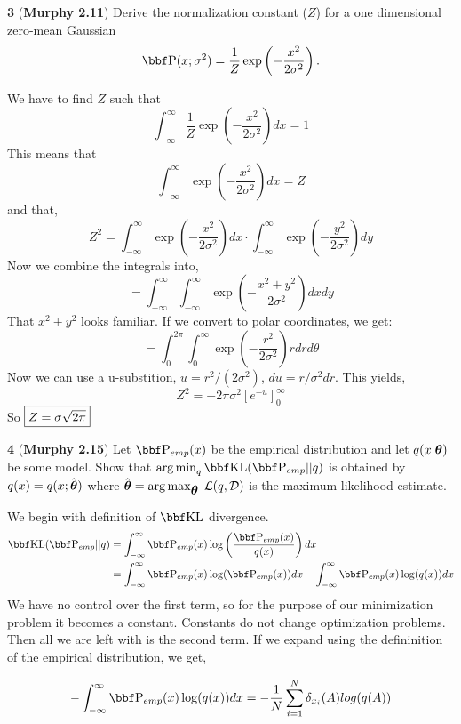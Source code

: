 \documentclass[12pt,letterpaper,fleqn]{hmcpset}
\begin{document}
\newpage

\textbf{3} (\textbf{Murphy 2.11}) Derive the normalization constant ($Z$) for a one dimensional
zero-mean Gaussian
\[
    \PP(x; \sigma^2) = \frac{1}{Z}\exp\left(-\frac{x^2}{2\sigma^2}\right).
\]

\begin{solution}
	We have to find $Z$ such that
	$$\int_{-\infty}^{\infty}\frac{1}{Z}\exp\left(-\frac{x^2}{2\sigma^2}\right)dx = 1$$
	This means that
	$$\int_{-\infty}^{\infty}\exp\left(-\frac{x^2}{2\sigma^2}\right)dx = Z$$
	and that, 
	$$ Z^2 = \int_{-\infty}^{\infty}\exp\left(-\frac{x^2}{2\sigma^2}\right)dx \cdot \int_{-\infty}^{\infty}\exp\left(-\frac{y^2}{2\sigma^2}\right)dy $$
	Now we combine the integrals into,
	$$ = \int_{-\infty}^{\infty}\int_{-\infty}^{\infty}\exp\left(-\frac{x^2+y^2}{2\sigma^2}\right)dxdy $$
	That $x^2 + y^2$ looks familiar. If we convert to polar coordinates, we get:
	$$ = \int_{0}^{2\pi}\int_{0}^{\infty}\exp\left(-\frac{r^2}{2\sigma^2}\right)rdrd\theta $$
	Now we can use a u-substition, $u=r^2/(2\sigma^2)$, $du = r/\sigma^2dr$. This yields,
	$$Z^2 = -2\pi \sigma^2 \left[ e^{-u} \right]_0^\infty$$
	So $\fbox{$Z=\sigma\sqrt{2\pi}$}$
	\end{solution}

\newpage




\textbf{4} (\textbf{Murphy 2.15}) Let $\PP_{emp}(x)$ be the empirical distribution and let
$q(x|\hbox{\boldmath$\theta$})$ be some model. Show that $\argmin_q \KL(\PP_{emp} || q)$ is obtained by
$q(x) = q(x ; \hat{\hbox{\boldmath$\theta$}})$ where $\hat{\hbox{\boldmath$\theta$}} = \operatorname*{arg\,max}_{\hbox{\boldmath$\theta$}} \;{\cal L}(q, {\cal D})$ is
the maximum likelihood estimate.

\vspace{15mm}
We begin with definition of $\KL$ divergence.
\begin{align*}
    \KL(\PP_{emp} || q) &= \int_{-\infty}^{\infty}\PP_{emp}(x)\log \left(\frac{\PP_{emp}(x)}{q(x)} \right)dx\\
    &= \int_{-\infty}^{\infty}\PP_{emp}(x)\log(\PP_{emp}(x))dx - \int_{-\infty}^{\infty}\PP_{emp}(x)\log(q(x))dx\\
\end{align*}
We have no control over the first term, so for the purpose of our minimization problem it becomes a constant. Constants do not change optimization problems. Then all we are left with is the second term. If we expand using the defininition of the empirical distribution, we get,

    $$- \int_{-\infty}^{\infty}\PP_{emp}(x)\log(q(x))dx = -\frac{1}{N}\sum_{i=1}^{N}\delta_{x_i}(A)log(q(A))$$
\end{document}
